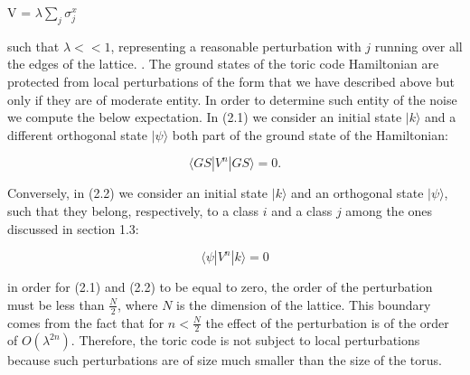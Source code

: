 \documentclass{Configuration_Files/PoliMi3i_thesis}
\begin{document}
\begin{center}
	V = $\lambda \sum_{j} \sigma^x_j $
\end{center}

such that $\lambda << 1 $, representing a reasonable perturbation with $j$ running over all the edges of the lattice. \cite{Kit02}. The ground states of the toric code Hamiltonian are protected from local perturbations of the form that we have described above but only if they are of moderate entity. In order to determine such entity of the noise we compute the below expectation. In (2.1) we consider an initial state $|k \rangle $ and a different orthogonal state $ |\psi \rangle $ both part of the ground state of the Hamiltonian: 

\begin{equation}
	 \langle GS |V^n| GS \rangle=0.                                    
\end{equation}

Conversely, in (2.2) we consider an initial state $|k \rangle $ and an orthogonal state $ |\psi \rangle $, such that they belong, respectively, to a class $i$ and a class $j$ among the ones discussed in section 1.3:

\begin{equation}
     \langle \psi|V^n| k \rangle=0  
\end{equation}

in order for {(2.1)} and {(2.2)} to be equal to zero, the order of the perturbation must be less than $ \frac{N}{2}$, where $N$ is the dimension of the lattice. 
This boundary comes from the fact that for $n < \frac{N}{2}$ the effect of the perturbation is of the order of $O(\lambda^{2n})$. Therefore, the toric code is not subject to local perturbations because such perturbations are of size much smaller than the size of the torus.
\end{document}
